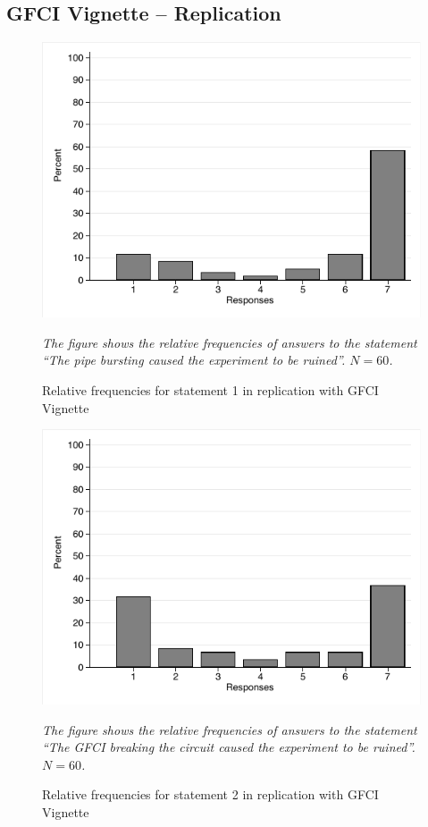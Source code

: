 \documentclass[egregdoesnotlikesansseriftitles,12pt]{scrartcl}
\begin{document}
\subsection{GFCI Vignette -- Replication}
\begin{figure}[H]
   \centering
   \includegraphics[scale=0.8]{figures/cir_rep_hist_1.pdf}
   \begin{minipage}{0.9\linewidth}
   \footnotesize
   \emph{The figure shows the relative frequencies of answers to the statement ``The pipe bursting caused the experiment to be ruined''. $N=60$.}
   \end{minipage}
   \caption{Relative frequencies for statement 1 in replication with GFCI Vignette}
   \label{fig:cir_rep_hist_1}
\end{figure}

\begin{figure}[H]
   \centering
   \includegraphics[scale=0.8]{figures/cir_rep_hist_2.pdf}
   \begin{minipage}{0.9\linewidth}
   \footnotesize
   \emph{The figure shows the relative frequencies of answers to the statement ``The GFCI breaking the circuit caused the experiment to be ruined''. $N=60$.}
   \end{minipage}
   \caption{Relative frequencies for statement 2 in replication with GFCI Vignette}
   \label{fig:cir_rep_hist_2}
\end{figure}
\end{document}
